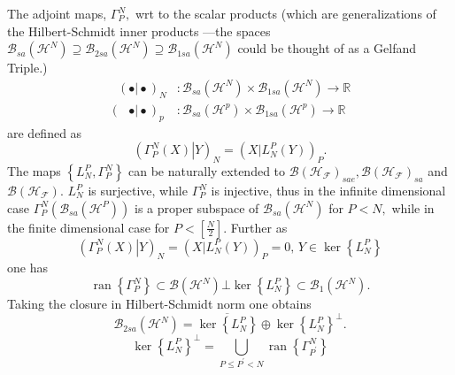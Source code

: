 \documentclass[aps,preprint]{revtex4}%
\begin{document}
The adjoint maps, $\Gamma_{P}^{N},$ wrt to the scalar products (which are
generalizations of the Hilbert-Schmidt inner products ---the spaces
$\mathcal{B}_{sa}\left(  \mathcal{H}^{N}\right)  \supseteq\mathcal{B}%
_{2sa}\left(  \mathcal{H}^{N}\right)  \supseteq\mathcal{B}_{1sa}\left(
\mathcal{H}^{N}\right)  $ could be thought of as a Gelfand Triple.)
\begin{align}
\text{ }\left(  \left.  \bullet\right\vert \bullet\right)  _{N}  &
:\mathcal{B}_{sa}\left(  \mathcal{H}^{N}\right)  \times\mathcal{B}%
_{1sa}\left(  \mathcal{H}^{N}\right)  \rightarrow\mathbb{R}\\
\left(  \text{ }\left.  \bullet\right\vert \bullet\right)  _{p}  &
:\mathcal{B}_{sa}\left(  \mathcal{H}^{p}\right)  \times\mathcal{B}%
_{1sa}\left(  \mathcal{H}^{p}\right)  \rightarrow\mathbb{R}%
\end{align}
are defined as
\begin{equation}
\left(  \left.  \Gamma_{P}^{N}\left(  X\right)  \right\vert Y\right)
_{N}=\left(  \left.  X\right\vert L_{N}^{P}\left(  Y\right)  \right)  _{P}.
\end{equation}
The maps $\left\{  L_{N}^{P},\Gamma_{P}^{N}\right\}  $ can be naturally
extended to $\mathcal{B}\left(  \mathcal{H}_{\mathcal{F}}\right)
_{sae},\mathcal{B}\left(  \mathcal{H}_{\mathcal{F}}\right)  _{sa}$ and
$\mathcal{B}\left(  \mathcal{H}_{\mathcal{F}}\right)  .$ $L_{N}^{P}$ is
surjective, while $\Gamma_{P}^{N}$ is injective, thus in the infinite
dimensional case $\Gamma_{P}^{N}\left(  \mathcal{B}_{sa}\left(  \mathcal{H}%
^{P}\right)  \right)  $ is a proper subspace of $\mathcal{B}_{sa}\left(
\mathcal{H}^{N}\right)  $ for $P<N,$ while in the finite dimensional case for
$P<\left[  \frac{N}{2}\right]  .$ Further as
\begin{equation}
\left(  \left.  \Gamma_{P}^{N}\left(  X\right)  \right\vert Y\right)
_{N}=\left(  \left.  X\right\vert L_{N}^{P}\left(  Y\right)  \right)
_{P}=0,\,Y\in\ker\left\{  L_{N}^{P}\right\}
\end{equation}
one has
\begin{equation}
\operatorname*{ran}\left\{  \Gamma_{P}^{N}\right\}  \subset\mathcal{B}\left(
\mathcal{H}^{N}\right)  \bot\ker\left\{  L_{N}^{P}\right\}  \subset
\mathcal{B}_{1}\left(  \mathcal{H}^{N}\right)  .
\end{equation}
Taking the closure in Hilbert-Schmidt norm one obtains
\begin{equation}
\mathcal{B}_{2sa}\left(  \mathcal{H}^{N}\right)  =\overline{\ker\left\{
L_{N}^{P}\right\}  }\oplus\ker\left\{  L_{N}^{P}\right\}  ^{\bot}.
\end{equation}%
\begin{equation}
\ker\left\{  L_{N}^{P}\right\}  ^{\bot}=%
{\displaystyle\bigcup\limits_{P\leq P^{\prime}<N}}
\operatorname*{ran}\left\{  \Gamma_{P^{\prime}}^{N}\right\}
\end{equation}
\end{document}
